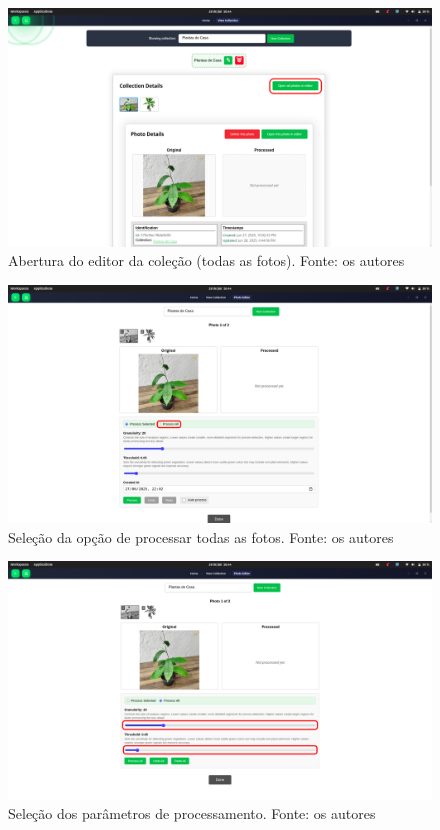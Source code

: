 \begin{figure}[H]
    \centering
    \includegraphics[width=1\textwidth]{../figures/screens/uc012/Screenshot from 2025-06-28 16-44-15.png}
    \caption{Abertura do editor da coleção (todas as fotos). Fonte: os autores}
    \label{fig:uc012-screen2}
\end{figure}

\begin{figure}[H]
    \centering
    \includegraphics[width=1\textwidth]{../figures/screens/uc012/Screenshot from 2025-06-28 16-44-28.png}
    \caption{Seleção da opção de processar todas as fotos. Fonte: os autores}
    \label{fig:uc012-screen3}
\end{figure}

\begin{figure}[H]
    \centering
    \includegraphics[width=1\textwidth]{../figures/screens/uc012/Screenshot from 2025-06-28 16-44-32.png}
    \caption{Seleção dos parâmetros de processamento. Fonte: os autores}
    \label{fig:uc012-screen4}
\end{figure}

